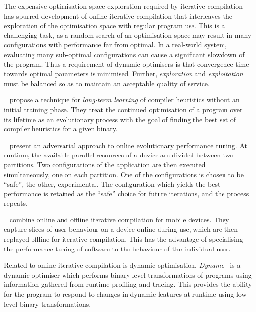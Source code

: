 The expensive optimisation space exploration required by iterative compilation has spurred development of online iterative compilation that interleaves the exploration of the optimisation space with regular program use. This is a challenging task, as a random search of an optimisation space may result in many configurations with performance far from optimal. In a real-world system, evaluating many sub-optimal configurations can cause a significant slowdown of the program. Thus a requirement of dynamic optimisers is that convergence time towards optimal parameters is minimised. Further, \emph{exploration} and \emph{exploitation} must be balanced so as to maintain an acceptable quality of service.

\citeauthor{Tartara2013}~\cite{Tartara2013} propose a technique for \emph{long-term learning} of compiler heuristics without an initial training phase. They treat the continued optimisation of a program over its lifetime as an evolutionary process with the goal of finding the best set of compiler heuristics for a given binary.

\citeauthor{Ansel2012}~\cite{Ansel2012} present an adversarial approach to online evolutionary performance tuning. At runtime, the available parallel resources of a device are divided between two partitions. Two configurations of the application are then executed simultaneously, one on each partition. One of the configurations is chosen to be ``safe'', the other, experimental. The configuration which yields the best performance is retained as the ``safe'' choice for future iterations, and the process repeats.

\citeauthor{Mpeis2015}~\cite{Mpeis2015} combine online and offline iterative compilation for mobile devices. They capture slices of user behaviour on a device online during use, which are then replayed offline for iterative compilation. This has the advantage of specialising the performance tuning of software to the behaviour of the individual user.

Related to online iterative compilation is dynamic optimisation. \emph{Dynamo}~\cite{Bala2000} is a dynamic optimiser which performs binary level transformations of programs using information gathered from runtime profiling and tracing. This provides the ability for the program to respond to changes in dynamic features at runtime using low-level binary transformations.


